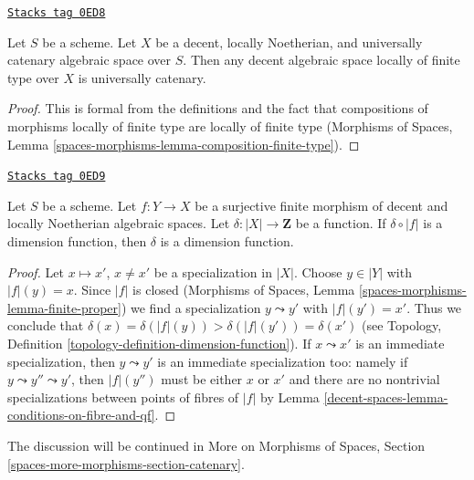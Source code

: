 \begin{lemma}
\label{decent-spaces-lemma-universally-catenary}
\href{https://stacks.math.columbia.edu/tag/0ED8}{\texttt{Stacks tag 0ED8}}

Let $S$ be a scheme. Let $X$ be a decent, locally Noetherian, and
universally catenary algebraic space over $S$. Then any decent algebraic
space locally of finite type over $X$ is universally catenary.
\end{lemma}

\begin{proof}
This is formal from the definitions and the fact that
compositions of morphisms locally of finite type are
locally of finite type (Morphisms of Spaces, Lemma
\ref{spaces-morphisms-lemma-composition-finite-type}).
\end{proof}

\begin{lemma}
\label{decent-spaces-lemma-check-dimension-function-finite-cover}
\href{https://stacks.math.columbia.edu/tag/0ED9}{\texttt{Stacks tag 0ED9}}

Let $S$ be a scheme. Let $f : Y \to X$ be a surjective finite morphism of
decent and locally Noetherian algebraic spaces. Let
$\delta : |X| \to \mathbf{Z}$ be a function. If $\delta \circ |f|$ is a
dimension function, then $\delta$ is a dimension function.
\end{lemma}

\begin{proof}
Let $x \mapsto x'$, $x \not = x'$ be a specialization in $|X|$.
Choose $y \in |Y|$ with $|f|(y) = x$. Since $|f|$ is closed
(Morphisms of Spaces, Lemma \ref{spaces-morphisms-lemma-finite-proper})
we find a specialization $y \leadsto y'$ with $|f|(y') = x'$.
Thus we conclude that
$\delta(x) = \delta(|f|(y)) > \delta(|f|(y')) = \delta(x')$
(see Topology, Definition \ref{topology-definition-dimension-function}).
If $x \leadsto x'$ is an immediate specialization, then
$y \leadsto y'$ is an immediate specialization too:
namely if $y \leadsto y'' \leadsto y'$, then $|f|(y'')$
must be either $x$ or $x'$ and there are no nontrivial
specializations between points of fibres of $|f|$ by
Lemma \ref{decent-spaces-lemma-conditions-on-fibre-and-qf}.
\end{proof}

The discussion will be continued in
More on Morphisms of Spaces, Section
\ref{spaces-more-morphisms-section-catenary}.



